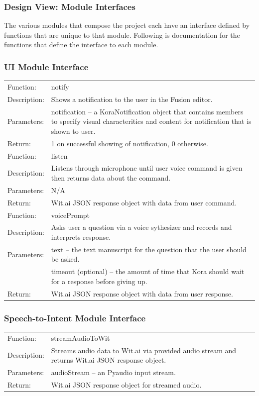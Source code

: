 \documentclass[onecolumn, draftclsnofoot,10pt, compsoc]{IEEEtran}
\def \botname{Kora\xspace}
\begin{document}
	\subsubsection{Design View: Module Interfaces}
	The various modules that compose the project each have an interface defined by functions that are unique to that module.
	Following is documentation for the functions that define the interface to each module.
	\subsubsection{UI Module Interface}
	\begin{tabular}[t]{l p{6in}}
		\hline
		Function: & notify \\
		Description: & Shows a notification to the user in the Fusion editor. \\
		Parameters: & notification -- a KoraNotification object that contains members to specify visual characteritics and content for notification that is shown to user. \\
		Return: & 1 on successful showing of notification, 0 otherwise. \\
		\hline
		Function: & listen \\
		Description: & Listens through microphone until user voice command is given then returns data about the command. \\
		Parameters: & N/A \\
		Return: & Wit.ai JSON response object with data from user command. \\
		\hline
		Function: & voicePrompt \\
		Description: & Asks user a question via a voice sythesizer and records and interprets response. \\
		Parameters: & text -- the text manuscript for the question that the user should be asked. \\
		& timeout (optional) -- the amount of time that \botname should wait for a response before giving up. \\
		Return: & Wit.ai JSON response object with data from user response. \\
		\hline
	\end{tabular}

	\subsubsection{Speech-to-Intent Module Interface}
	\begin{tabular}[t]{l p{6in}}
		\hline
		Function: &  streamAudioToWit \\
		Description: & Streams audio data to Wit.ai via provided audio stream and returns Wit.ai JSON response object. \\
		Parameters: & audioStream -- an Pyaudio input stream. \\
		Return: & Wit.ai JSON response object for streamed audio. \\
		\hline
	\end{tabular}
\end{document}
